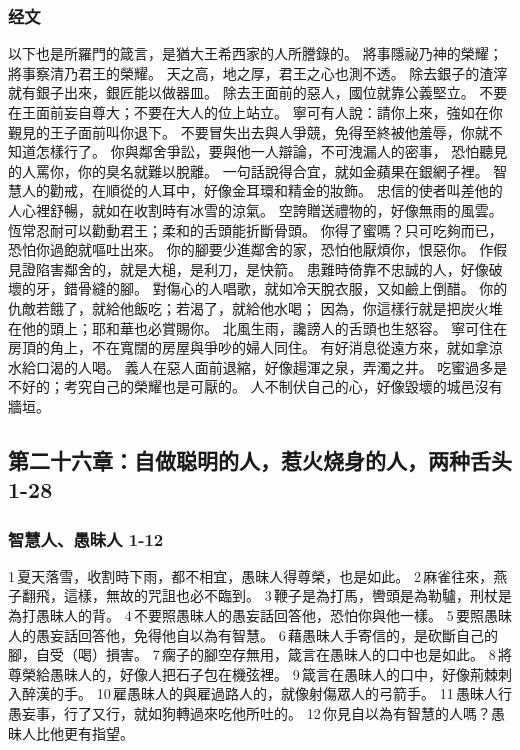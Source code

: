 \subsubsection{经文}
以下也是所羅門的箴言，是猶大王希西家的人所謄錄的。
將事隱祕乃神的榮耀；將事察清乃君王的榮耀。
天之高，地之厚，君王之心也測不透。
除去銀子的渣滓就有銀子出來，銀匠能以做器皿。
除去王面前的惡人，國位就靠公義堅立。
不要在王面前妄自尊大；不要在大人的位上站立。
寧可有人說：請你上來，強如在你覲見的王子面前叫你退下。
不要冒失出去與人爭競，免得至終被他羞辱，你就不知道怎樣行了。
你與鄰舍爭訟，要與他一人辯論，不可洩漏人的密事，
恐怕聽見的人罵你，你的臭名就難以脫離。
一句話說得合宜，就如金蘋果在銀網子裡。
智慧人的勸戒，在順從的人耳中，好像金耳環和精金的妝飾。
忠信的使者叫差他的人心裡舒暢，就如在收割時有冰雪的涼氣。
空誇贈送禮物的，好像無雨的風雲。
恆常忍耐可以勸動君王；柔和的舌頭能折斷骨頭。
你得了蜜嗎？只可吃夠而已，恐怕你過飽就嘔吐出來。
你的腳要少進鄰舍的家，恐怕他厭煩你，恨惡你。
作假見證陷害鄰舍的，就是大槌，是利刀，是快箭。
患難時倚靠不忠誠的人，好像破壞的牙，錯骨縫的腳。
對傷心的人唱歌，就如冷天脫衣服，又如鹼上倒醋。
你的仇敵若餓了，就給他飯吃；若渴了，就給他水喝；
因為，你這樣行就是把炭火堆在他的頭上；耶和華也必賞賜你。
北風生雨，讒謗人的舌頭也生怒容。
寧可住在房頂的角上，不在寬闊的房屋與爭吵的婦人同住。
有好消息從遠方來，就如拿涼水給口渴的人喝。
義人在惡人面前退縮，好像𧼮渾之泉，弄濁之井。
吃蜜過多是不好的；考究自己的榮耀也是可厭的。
人不制伏自己的心，好像毀壞的城邑沒有牆垣。



\subsection{第二十六章：自做聪明的人，惹火烧身的人，两种舌头 1-28}
\subsubsection{智慧人、愚昧人 1-12}
1 夏天落雪，收割時下雨，都不相宜，愚昧人得尊榮，也是如此。 
2 麻雀往來，燕子翻飛，這樣，無故的咒詛也必不臨到。 
3 鞭子是為打馬，轡頭是為勒驢，刑杖是為打愚昧人的背。 
4 不要照愚昧人的愚妄話回答他，恐怕你與他一樣。 
5 要照愚昧人的愚妄話回答他，免得他自以為有智慧。 
6 藉愚昧人手寄信的，是砍斷自己的腳，自受（喝）損害。 
7 瘸子的腳空存無用，箴言在愚昧人的口中也是如此。 
8 將尊榮給愚昧人的，好像人把石子包在機弦裡。 
9 箴言在愚昧人的口中，好像荊棘刺入醉漢的手。 
10 雇愚昧人的與雇過路人的，就像射傷眾人的弓箭手。 
11 愚昧人行愚妄事，行了又行，就如狗轉過來吃他所吐的。 
12 你見自以為有智慧的人嗎？愚昧人比他更有指望。


